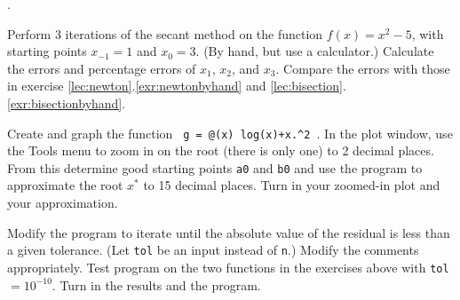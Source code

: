 \begin{list}
{.}{}


\item Perform 3 iterations of the secant method
      on the function $f(x) = x^2-5$, with starting
       points $x_{-1} = 1$ and $x_0 =3$. (By hand, but use a calculator.)
      Calculate the errors and percentage errors of
      $x_1$, $x_2$, and $x_3$. Compare the errors
      with those in exercise \ref{lec:newton}.\ref{exr:newtonbyhand}  and
       \ref{lec:bisection}.\ref{exr:bisectionbyhand}.
      \label{exr:secantbyhand}
      
      
\item Create and graph the function \verb& g = @(x) log(x)+x.^2 &.
 In the plot window, use the Tools menu to zoom in on the root (there is only one)
 to 2 decimal places.
 From this determine good starting points \verb&a0& and \verb&b0& and use
 the program   to approximate the root $x^*$ to 15 decimal places. 
 Turn in your zoomed-in plot and your approximation.

  
  
\item Modify the program  to iterate until the
  absolute value of the residual is less than a given tolerance. (Let
  \verb&tol& be an input instead of \verb&n&.) Modify the comments
   appropriately.  Test program on the two functions in the exercises 
   above with \verb&tol& $= 10^{-10}$. Turn in the results and the program.



\end{list}




